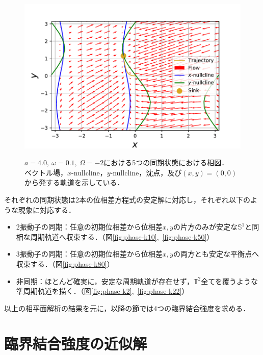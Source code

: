 \documentclass[../main]{subfiles}
\begin{document}
\begin{figure}[tbp]
\begin{minipage}[b]{0.47\linewidth}
      \includegraphics[keepaspectratio, scale=0.42]{images/phase_a4K80.pdf}
      \label{fig:phase-k80}
    \end{minipage}
    \caption{$a=4.0,\ \omega=0.1,\ \Omega=-2$における5つの同期状態における相図．\\
    ベクトル場，$x$-nullcline，$y$-nullcline，沈点，及び$(x,y)=(0,0)$から発する軌道を示している．}
    \label{fig:phase}
\end{figure}

それぞれの同期状態は2本の位相差方程式の安定解に対応し，それぞれ以下のような現象に対応する．
\begin{itemize}
    \item 
    2振動子の同期：任意の初期位相差から位相差$x,y$の片方のみが安定な$\mathbb{S}^1$と同相な周期軌道へ収束する．（図\ref{fig:phase-k10},\ \ref{fig:phase-k50}）
    \item
    3振動子の同期：任意の初期位相差から位相差$x,y$の両方とも安定な平衡点へ収束する．（図\ref{fig:phase-k80}）
    \item
    非同期：ほとんど確実に，安定な周期軌道が存在せず，$\mathbb{T}^2$全てを覆うような準周期軌道を描く．（図\ref{fig:phase-k2},\ \ref{fig:phase-k22}）
\end{itemize}
以上の相平面解析の結果を元に，以降の節では4つの臨界結合強度を求める．
\section{臨界結合強度の近似解}
\label{sec:3body-critical}
\end{document}
